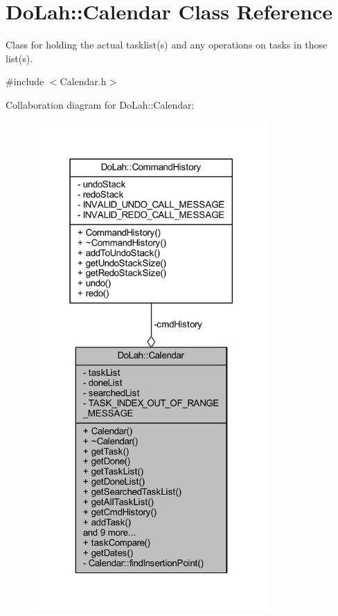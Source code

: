 \hypertarget{class_do_lah_1_1_calendar}{}\section{Do\+Lah\+:\+:Calendar Class Reference}
\label{class_do_lah_1_1_calendar}


Class for holding the actual tasklist(s) and any operations on tasks in those list(s).  




{\ttfamily \#include $<$Calendar.\+h$>$}



Collaboration diagram for Do\+Lah\+:\+:Calendar\+:\nopagebreak
\begin{figure}[H]
\begin{center}
\leavevmode
\includegraphics[width=256pt]{class_do_lah_1_1_calendar__coll__graph}
\end{center}
\end{figure}

